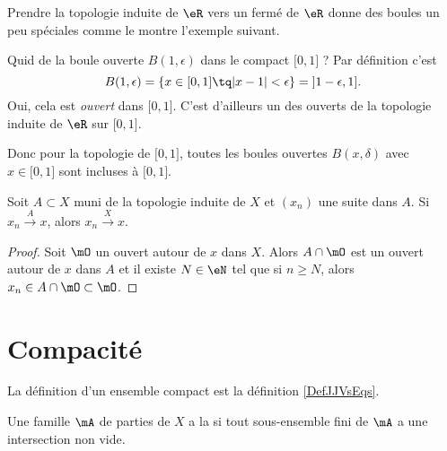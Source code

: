Prendre la topologie induite de \( \eR\) vers un fermé de \( \eR\) donne des boules un peu spéciales comme le montre l'exemple suivant.

\begin{example}  \label{ExKYZwYxn}
    Quid de la boule ouverte \( B(1,\epsilon)\) dans le compact \( \mathopen[ 0 , 1 \mathclose]\) ? Par définition c'est
    \begin{equation}
        B(1,\epsilon)=\{ x\in\mathopen[ 0 , 1 \mathclose]\tq | x-1 |<\epsilon \}=\mathopen] 1-\epsilon , 1 \mathclose].
    \end{equation}
    Oui, cela est \emph{ouvert} dans \( \mathopen[ 0 , 1 \mathclose]\). C'est d'ailleurs un des ouverts de la topologie induite de \( \eR\) sur \( \mathopen[ 0 , 1 \mathclose]\).

    Donc pour la topologie de \( \mathopen[ 0 , 1 \mathclose]\), toutes les boules ouvertes \( B(x,\delta)\) avec \( x\in\mathopen[ 0 , 1 \mathclose]\) sont incluses à \( \mathopen[ 0 , 1 \mathclose]\).
\end{example}


\begin{lemma}   \label{LemPESaiVw}
    Soit \( A\subset X\) muni de la topologie induite de \( X\) et \( (x_n)\) une suite dans \( A\). Si \( x_n\stackrel{A}{\longrightarrow}x\), alors \( x_n\stackrel{X}{\longrightarrow}x\). 
\end{lemma}

\begin{proof}
    Soit \( \mO\) un ouvert autour de \( x\) dans \( X\). Alors \( A\cap\mO\) est un ouvert autour de \( x\) dans \( A\) et il existe \( N\in \eN\) tel que si \( n\geq N\), alors \( x_n\in A\cap\mO\subset\mO\).
\end{proof}

\section{Compacité}

La définition d'un ensemble compact est la définition \ref{DefJJVsEqs}.

\begin{definition}
    Une famille \( \mA\) de parties de \( X\) a la  si tout sous-ensemble fini de \( \mA\) a une intersection non vide.
\end{definition}

